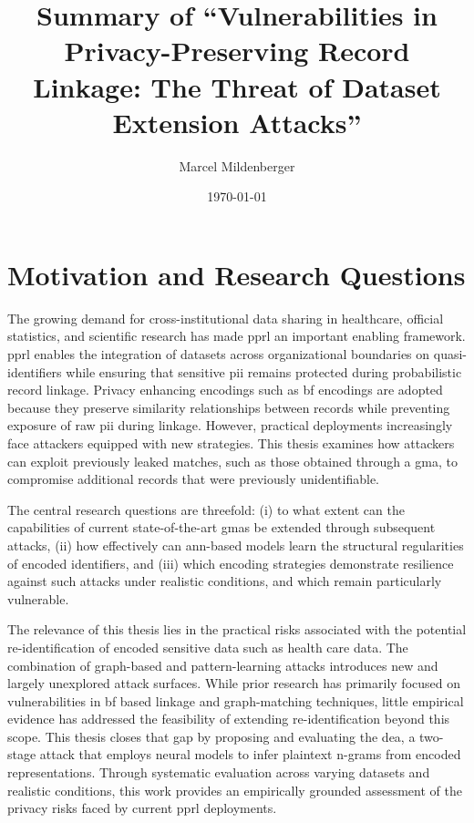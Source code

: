 \documentclass[a4paper,11pt]{scrartcl}
\title{Summary of ``Vulnerabilities in Privacy-Preserving Record Linkage: The Threat of Dataset Extension Attacks''}
\author{Marcel Mildenberger}
\date{\today}
\begin{document}
\maketitle

\section{Motivation and Research Questions}
The growing demand for cross-institutional data sharing in healthcare, official statistics, and scientific research has made \ac{pprl} an important enabling framework. 
\ac{pprl} enables the integration of datasets across organizational boundaries on quasi-identifiers while ensuring that sensitive \ac{pii} remains protected during probabilistic record linkage. 
Privacy enhancing encodings such as \ac{bf} encodings are adopted because they preserve similarity relationships between records while preventing exposure of raw \ac{pii} during linkage. 
However, practical deployments increasingly face attackers equipped with new strategies. 
This thesis examines how attackers can exploit previously leaked matches, such as those obtained through a \ac{gma}, to compromise additional records that were previously unidentifiable. 

The central research questions are threefold: 
(i) to what extent can the capabilities of current state-of-the-art \ac{gma}s be extended through subsequent attacks, 
(ii) how effectively can \ac{ann}-based models learn the structural regularities of encoded identifiers, 
and (iii) which encoding strategies demonstrate resilience against such attacks under realistic conditions, and which remain particularly vulnerable.

The relevance of this thesis lies in the practical risks associated with the potential re-identification of encoded sensitive data such as health care data.
The combination of graph-based and pattern-learning attacks introduces new and largely unexplored attack surfaces. 
While prior research has primarily focused on vulnerabilities in \ac{bf} based linkage and graph-matching techniques, little empirical evidence has addressed the feasibility of extending re-identification beyond this scope. 
This thesis closes that gap by proposing and evaluating the \ac{dea}, a two-stage attack that employs neural models to infer plaintext n-grams from encoded representations. 
Through systematic evaluation across varying datasets and realistic conditions, this work provides an empirically grounded assessment of the privacy risks faced by current \ac{pprl} deployments.
\end{document}
